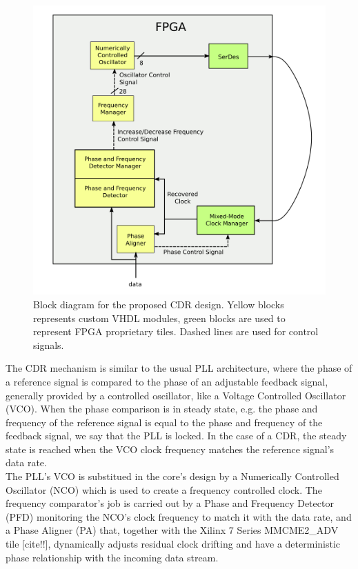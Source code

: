 \documentclass[11pt]{article}
\renewcommand{\>}{\rangle} \renewcommand{\emptyset}{\varnothing}
\begin{document}
\begin{figure}[H]
  \centerline{\includegraphics[width=0.5\linewidth]{images/block}}
  \caption{Block diagram for the proposed CDR design. Yellow blocks represents
    custom VHDL modules, green blocks are used to represent FPGA proprietary
    tiles. Dashed lines are used for control signals.}
  \label{fig:cdr_overview}
\end{figure}

The CDR mechanism is similar to the usual PLL architecture, where the phase of a
reference signal is compared to the phase of an adjustable feedback signal,
generally provided by a controlled oscillator, like a Voltage Controlled
Oscillator (VCO). When the phase comparison is in steady state, e.g. the phase
and frequency of the reference signal is equal to the phase and frequency of the
feedback signal, we say that the PLL is locked. In the case of a CDR, the steady
state is reached when the VCO clock frequency
matches the reference signal's data rate.\\
The PLL's VCO is substitued in the core's design by a Numerically Controlled
Oscillator (NCO) which is used to create a frequency controlled clock. The
frequency comparator's job is carried out by a Phase and Frequency Detector
(PFD) monitoring the NCO's clock frequency to match it with the data rate, and a
Phase Aligner (PA) that, together with the Xilinx 7 Series MMCME2\_ADV tile
[cite!!], dynamically adjusts residual clock drifting and have a deterministic
phase
relationship with the incoming data stream.\\
\end{document}
